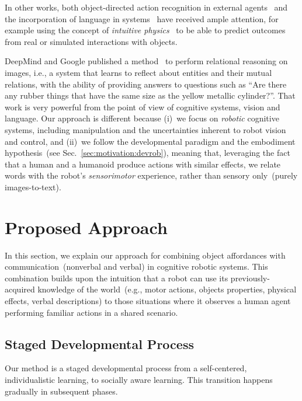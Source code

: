 In other works, both object-directed action recognition in external agents~\cite{koppula:2013:ijrr} and the incorporation of language in \hr{} systems~\cite{harnad:1990,matuszek:2014:aaai} have received ample attention, for example using the concept of \emph{intuitive physics}~\cite{lake:2017:bbs,gao:2018:acl} to be able to predict outcomes from real or simulated interactions with objects.

DeepMind and Google published a method~\cite{santoro:2017:relational_reasoning} to perform relational reasoning on images, i.e., a system that learns to reflect about entities and their mutual relations, with the ability of providing answers to questions such as ``Are there any rubber things that have the same size as the yellow metallic cylinder?''.
That work is very powerful from the point of view of cognitive systems, vision and language.
Our approach is different because
(i)~we focus on \emph{robotic} cognitive systems, including manipulation and the uncertainties inherent to robot vision and control, and
(ii)~we follow the developmental paradigm and the embodiment hypothesis~(see Sec.~\ref{sec:motivation:devrob}), meaning that, leveraging the fact that a human and a humanoid produce actions with similar effects, we relate words with the robot's \emph{sensorimotor} experience, rather than sensory only~(purely images-to-text).

\section{Proposed Approach}
\label{sec:gestures:approach}

In this section, we explain our approach for combining object affordances with communication~(nonverbal and verbal) in cognitive robotic systems.
This combination builds upon the intuition that a robot can use its previously-acquired knowledge of the world~(e.g., motor actions, objects properties, physical effects, verbal descriptions) to those situations where it observes a human agent performing familiar actions in a shared \hr{} scenario.

\subsection{Staged Developmental Process}
\label{sec:gestures:approach:stages}

Our method is a staged developmental process from a self-centered, individualistic learning, to socially aware learning.
This transition happens gradually in subsequent phases.

